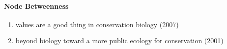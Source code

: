 \documentclass[lettepaper,]{article}
\providecommand{\tightlist}{%
  \setlength{\itemsep}{0pt}\setlength{\parskip}{0pt}}
\let\oldparagraph\paragraph
\renewcommand{\paragraph}[1]{\oldparagraph{#1}\mbox{}}
\begin{document}
\hypertarget{node-betweenness-6}{%
\paragraph{Node Betweenness}\label{node-betweenness-6}}

\begin{enumerate}
\def\labelenumi{\arabic{enumi}.}
\tightlist
\item
  values are a good thing in conservation biology (2007)
\item
  beyond biology toward a more public ecology for conservation (2001)
\end{enumerate}
\end{document}
